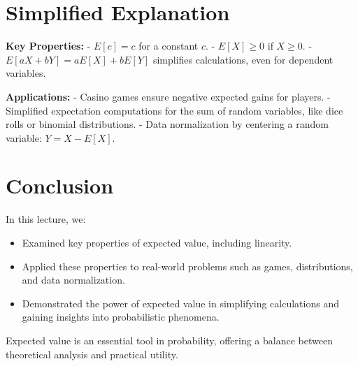 \documentclass{article}
\begin{document}
\section*{Simplified Explanation}

\textbf{Key Properties:}
- $E[c] = c$ for a constant $c$.
- $E[X] \geq 0$ if $X \geq 0$.
- $E[aX + bY] = aE[X] + bE[Y]$ simplifies calculations, even for dependent variables.

\textbf{Applications:}
- Casino games ensure negative expected gains for players.
- Simplified expectation computations for the sum of random variables, like dice rolls or binomial distributions.
- Data normalization by centering a random variable: $Y = X - E[X]$.

\section*{Conclusion}

In this lecture, we:
\begin{itemize}
  \item Examined key properties of expected value, including linearity.
  \item Applied these properties to real-world problems such as games, distributions, and data normalization.
  \item Demonstrated the power of expected value in simplifying calculations and gaining insights into probabilistic phenomena.
\end{itemize}

Expected value is an essential tool in probability, offering a balance between theoretical analysis and practical utility.
\end{document}
